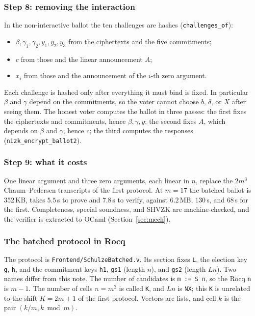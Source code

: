 \documentclass[11pt,a4paper]{article}
\newcommand{\rocq}[1]{\texttt{#1}}
\theoremstyle{remark}
\begin{document}
\subsubsection*{Step 8: removing the interaction}
In the non-interactive ballot the ten challenges are hashes
(\rocq{challenges\_of}):
\begin{itemize}[nosep]
  \item $\beta, \gamma_1, \gamma_2, y_1, y_2, y_3$ from the ciphertexts and
  the five commitments;
  \item $c$ from those and the linear announcement $A$;
  \item $x_i$ from those and the announcement of the $i$-th zero argument.
\end{itemize}
Each challenge is hashed only after everything it must bind is fixed. In
particular $\beta$ and $\gamma$ depend on the commitments, so the voter
cannot choose $b$, $\delta$, or $X$ after seeing them. The honest voter
computes the ballot in three passes: the first fixes the ciphertexts and
commitments, hence $\beta, \gamma, y$; the second fixes $A$, which depends
on $\beta$ and $\gamma$, hence $c$; the third computes the responses
(\rocq{nizk\_encrypt\_ballot2}).

\subsubsection*{Step 9: what it costs}
One linear argument and three zero arguments, each linear in $n$, replace
the $2m^3$ Chaum--Pedersen transcripts of the first protocol. At $m = 17$
the batched ballot is $352$\,KB, takes $5.5$\,s to prove and $7.8$\,s to
verify, against $6.2$\,MB, $130$\,s, and $68$\,s for the first.
Completeness, special soundness, and SHVZK are machine-checked, and the
verifier is extracted to OCaml (Section~\ref{sec:mech}).

\subsubsection*{The batched protocol in Rocq}
The protocol is \rocq{Frontend/SchulzeBatched.v}. Its section fixes
\rocq{L}, the election key \rocq{g}, \rocq{h}, and the commitment keys
\rocq{h1}, \rocq{gs1} (length $n$), and \rocq{gs2} (length $Ln$). Two
names differ from this note. The number of candidates is \rocq{m := S
n}, so the Rocq \rocq{n} is $m - 1$. The number of cells $n = m^2$ is
called \rocq{K}, and $Ln$ is \rocq{NX}; this \rocq{K} is unrelated to the
shift $K = 2m + 1$ of the first protocol. Vectors are lists, and cell $k$
is the pair $(k / m, k \bmod m)$.
\end{document}
